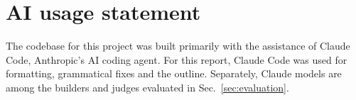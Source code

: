 \section*{AI usage statement}
\label{sec:ai-usage}

The codebase for this project was built primarily with the assistance of Claude Code, Anthropic's AI coding agent.
For this report, Claude Code was used for formatting, grammatical fixes and the outline.
Separately, Claude models are among the builders and judges evaluated in Sec.~\ref{sec:evaluation}.
